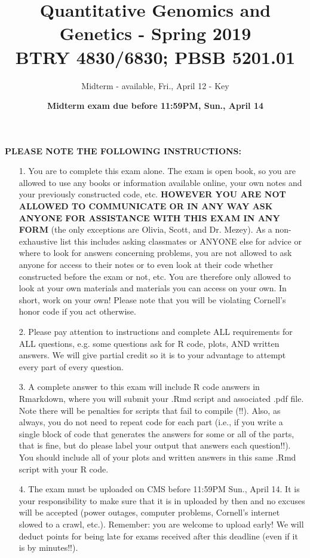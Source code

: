 \documentclass[letterpaper, 11pt]{article}
\title{Quantitative Genomics and Genetics - Spring 2019 \\
BTRY 4830/6830; PBSB 5201.01}
\author{Midterm - available, Fri., April 12 - Key}
\date{{\bf Midterm exam due before 11:59PM, Sun., April 14}}
\begin{document}
\vspace{-20in}

\maketitle

{\bf PLEASE NOTE THE FOLLOWING INSTRUCTIONS:}

\begin{itemize}
\item[1.] You are to complete this exam alone. The exam is open book, so you are allowed to use any books or information available online, your own notes and your previously constructed code, etc.  \textbf{HOWEVER YOU ARE NOT ALLOWED TO COMMUNICATE OR IN ANY WAY ASK ANYONE FOR ASSISTANCE WITH THIS EXAM IN ANY FORM} (the only exceptions are Olivia, Scott, and Dr. Mezey).  As a non-exhaustive list this includes asking classmates or ANYONE else for advice or where to look for answers concerning problems, you are not allowed to ask anyone for access to their notes or to even look at their code whether constructed before the exam or not, etc.  You are therefore only allowed to look at your own materials and materials you can access on your own.  In short, work on your own!  Please note that you will be violating Cornell's honor code if you act otherwise.

\item[2.] Please pay attention to instructions and complete ALL requirements for ALL questions, e.g. some questions ask for R code, plots, AND written answers.  We will give partial credit so it is to your advantage to attempt every part of every question.  

\item[3.] A complete answer to this exam will include R code answers in Rmarkdown, where you will submit your .Rmd script and associated .pdf file.  Note there will be penalties for scripts that fail to compile (!!).  Also, as always, you do not need to repeat code for each part (i.e., if you write a single block of code that generates the answers for some or all of the parts, that is fine, but do please label your output that answers each question!!).  You should include all of your plots and written answers in this same .Rmd script with your R code.  

\item[4.] The exam must be uploaded on CMS before 11:59PM Sun., April 14.  It is your responsibility to make sure that it is in uploaded by then and no excuses will be accepted (power outages, computer problems, Cornell's internet slowed to a crawl, etc.).  Remember: you are welcome to upload early!  We will deduct points for being late for exams received after this deadline (even if it is by minutes!!).
\end{itemize}
\end{document}
